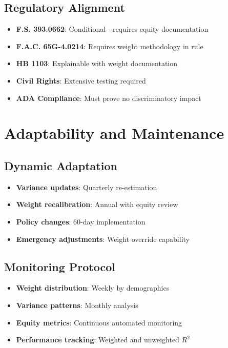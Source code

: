 \subsection{Regulatory Alignment}

\begin{itemize}
    \item \textbf{F.S. 393.0662}: Conditional - requires equity documentation
    \item \textbf{F.A.C. 65G-4.0214}: Requires weight methodology in rule
    \item \textbf{HB 1103}: Explainable with weight documentation
    \item \textbf{Civil Rights}: Extensive testing required
    \item \textbf{ADA Compliance}: Must prove no discriminatory impact
\end{itemize}

\section{Adaptability and Maintenance}

\subsection{Dynamic Adaptation}

\begin{itemize}
    \item \textbf{Variance updates}: Quarterly re-estimation
    \item \textbf{Weight recalibration}: Annual with equity review
    \item \textbf{Policy changes}: 60-day implementation
    \item \textbf{Emergency adjustments}: Weight override capability
\end{itemize}

\subsection{Monitoring Protocol}

\begin{itemize}
    \item \textbf{Weight distribution}: Weekly by demographics
    \item \textbf{Variance patterns}: Monthly analysis
    \item \textbf{Equity metrics}: Continuous automated monitoring
    \item \textbf{Performance tracking}: Weighted and unweighted $R^2$
\end{itemize}

